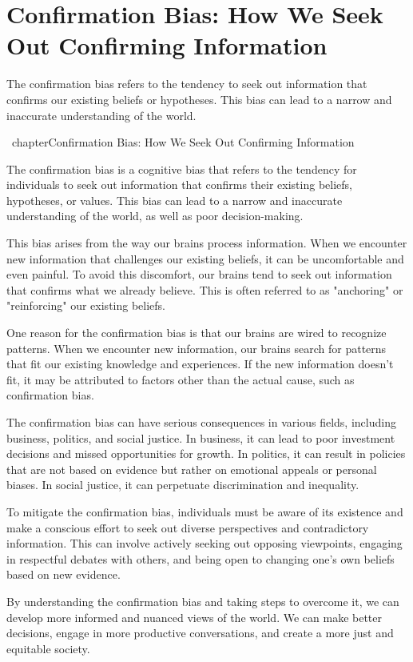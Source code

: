 \documentclass{report}%
\begin{document}
\section{Confirmation Bias: How We Seek Out Confirming Information}%
The confirmation bias refers to the tendency to seek out information that confirms our existing beliefs or hypotheses. This bias can lead to a narrow and inaccurate understanding of the world.

%
\ chapter{Confirmation Bias: How We Seek Out Confirming Information}

The confirmation bias is a cognitive bias that refers to the tendency for individuals to seek out information that confirms their existing beliefs, hypotheses, or values. This bias can lead to a narrow and inaccurate understanding of the world, as well as poor decision-making.

This bias arises from the way our brains process information. When we encounter new information that challenges our existing beliefs, it can be uncomfortable and even painful. To avoid this discomfort, our brains tend to seek out information that confirms what we already believe. This is often referred to as "anchoring" or "reinforcing" our existing beliefs.

One reason for the confirmation bias is that our brains are wired to recognize patterns. When we encounter new information, our brains search for patterns that fit our existing knowledge and experiences. If the new information doesn't fit, it may be attributed to factors other than the actual cause, such as confirmation bias.

The confirmation bias can have serious consequences in various fields, including business, politics, and social justice. In business, it can lead to poor investment decisions and missed opportunities for growth. In politics, it can result in policies that are not based on evidence but rather on emotional appeals or personal biases. In social justice, it can perpetuate discrimination and inequality.

To mitigate the confirmation bias, individuals must be aware of its existence and make a conscious effort to seek out diverse perspectives and contradictory information. This can involve actively seeking out opposing viewpoints, engaging in respectful debates with others, and being open to changing one's own beliefs based on new evidence.

By understanding the confirmation bias and taking steps to overcome it, we can develop more informed and nuanced views of the world. We can make better decisions, engage in more productive conversations, and create a more just and equitable society.
\end{document}
